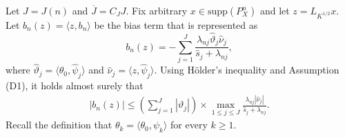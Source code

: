 \documentclass[11pt,a4paper]{article}
\renewcommand{\hat}{\widehat}
\renewcommand{\bar}{\overline}
\theoremstyle{definition}
\theoremstyle{plain}
\theoremstyle{remark}
\newcommand{\supp}{\mathrm{supp}}
\newcommand{\pd}[1]{
	{ \color{blue} PD: #1}
}
\begin{document}
Let $J=J(n)$ and $\bar J=C_JJ$.
Fix arbitrary $x\in\supp(P_X^n)$ and let $z=L_{K^{1/2}}x$. Let $b_n(z)=\langle z, b_n\rangle$ be the bias term that is represented as
$$
b_n(z) = -\sum_{j=1}^J\frac{\lambda_{nj}\hat\vartheta_j\hat\nu_j}{\hat s_j+\lambda_{nj}},
$$
where $\hat\vartheta_j=\langle\theta_0,\hat\psi_j\rangle$ and $\hat\nu_j=\langle z, \hat\psi_j\rangle$. 
Using H\"{o}lder's inequality and Assumption (D1), it holds almost surely that
\begin{align}
\big|b_n(z)\big| \leq \left(\sum_{j=1}^{J}|\vartheta_j|\right)\times \max_{1\leq j\leq J}\frac{\lambda_{nj}|\hat\nu_j|}{\hat s_j+\lambda_{nj}}.
\label{eq:proof-adptr-limiting-1}
\end{align}
Recall the definition that $\theta_k=\langle\theta_0,\psi_k\rangle$ for every $k\geq 1$.
\end{document}
